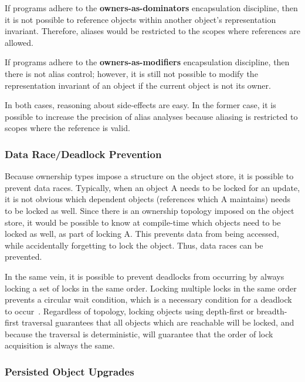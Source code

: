 \documentclass{acm_proc_article-sp}
\begin{document}
If programs adhere to the \textbf{owners-as-dominators} encapsulation 
discipline, then it is not possible to reference objects within another 
object's representation invariant. Therefore, aliases would be restricted to 
the scopes where references are allowed.

If programs adhere to the \textbf{owners-as-modifiers} encapsulation 
discipline, then there is not alias control; however, it is still not possible 
to modify the representation invariant of an object if the current object is 
not its owner.

In both cases, reasoning about side-effects are easy. In the former case, it is 
possible to increase the precision of alias analyses because aliasing is 
restricted to scopes where the reference is valid.

\subsubsection{Data Race/Deadlock Prevention}
\label{subsubsec:data_race_prevention}

Because ownership types impose a structure on the object store, it is possible 
to prevent data races. Typically, when an object A needs to be locked for an 
update, it is not obvious which dependent objects (references which A 
maintains) needs to be locked as well. Since there is an ownership topology 
imposed on the object store, it would be possible to know at compile-time which 
objects need to be locked as well, as part of locking A. This prevents data 
from being accessed, while accidentally forgetting to lock the object. Thus, 
data races can be prevented.

In the same vein, it is possible to prevent deadlocks from occurring by always 
locking a set of locks in the same order. Locking multiple locks in the same 
order prevents a circular wait condition, which is a necessary condition for a 
deadlock to occur~\cite{silberschatz2006osprinciples}. Regardless of topology, 
locking objects using depth-first or breadth-first traversal guarantees that 
all objects which are reachable will be locked, and because the traversal is 
deterministic, will guarantee that the order of lock acquisition is always the 
same.

\subsubsection{Persisted Object Upgrades}
\label{subsubsec:object_upgrades}
\end{document}
